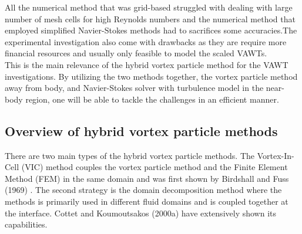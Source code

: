 
All the numerical method that was grid-based struggled with dealing with large number of mesh cells for high Reynolds numbers and the numerical method that employed simplified Navier-Stokes methods had to sacrifices some accuracies.The experimental investigation also come with drawbacks as they are require more financial resources and usually only feasible to model the scaled VAWTs.\\

This is the main relevance of the hybrid vortex particle method for the VAWT investigations. By utilizing the two methods together, the vortex particle method away from body, and Navier-Stokes solver with turbulence model in the near-body region, one will be able to tackle the challenges in an efficient manner.\\ 

\subsection{Overview of hybrid vortex particle methods}

There are two main types of the hybrid vortex particle methods. The Vortex-In-Cell (VIC) method couples the vortex particle method and the Finite Element Method (FEM) in the same domain and was first shown by Birdshall and Fuss (1969) \cite{Birdsall1969}. The second strategy is the domain decomposition method where the methods is primarily used in different fluid domains and is coupled together at the interface. Cottet and Koumoutsakos (2000a) \cite{Cottet2000a} have extensively shown its capabilities.

